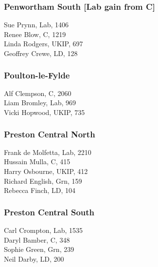 \documentclass[a4paper,openany,10pt]{book}
\begin{document}
\subsubsection*{Penwortham South \hspace*{\fill}\nolinebreak[1]%
\enspace\hspace*{\fill}
[Lab gain from C]}



Sue Prynn, Lab, 1406\\
Renee Blow, C, 1219\\
Linda Rodgers, UKIP, 697\\
Geoffrey Crewe, LD, 128\\


\subsubsection*{Poulton-le-Fylde}



Alf Clempson, C, 2060\\
Liam Bromley, Lab, 969\\
Vicki Hopwood, UKIP, 735\\


\subsubsection*{Preston Central North}



Frank de Molfetta, Lab, 2210\\
Hussain Mulla, C, 415\\
Harry Osbourne, UKIP, 412\\
Richard English, Grn, 159\\
Rebecca Finch, LD, 104\\


\subsubsection*{Preston Central South}



Carl Crompton, Lab, 1535\\
Daryl Bamber, C, 348\\
Sophie Green, Grn, 239\\
Neil Darby, LD, 200\\
\end{document}
